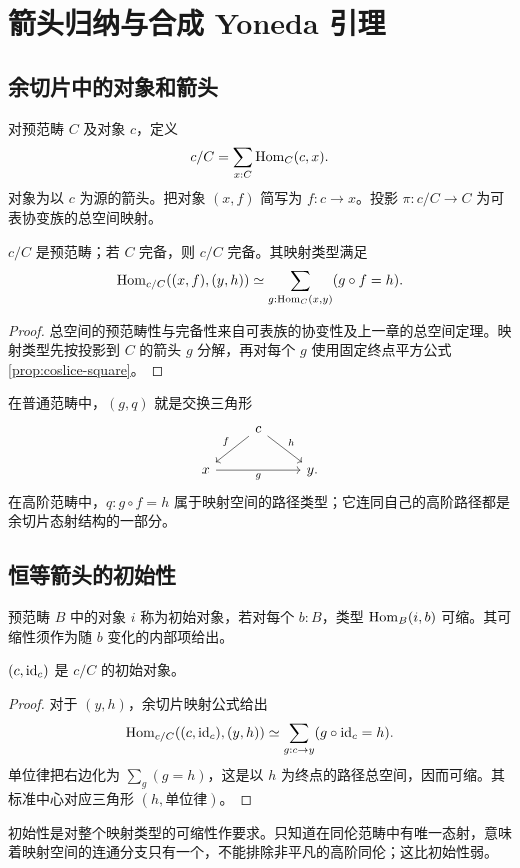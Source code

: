 \chapter{箭头归纳与合成 Yoneda 引理}
\section{余切片中的对象和箭头}
\begin{definition}[余切片]
对预范畴 $C$ 及对象 $c$，定义
\[
c/C=\sum_{x:C}\operatorname{Hom}_C(c,x).
\]
对象为以 $c$ 为源的箭头。把对象 $(x,f)$ 简写为 $f:c\to x$。投影 $\pi:c/C\to C$ 为可表协变族的总空间映射。
\end{definition}
\begin{proposition}
$c/C$ 是预范畴；若 $C$ 完备，则 $c/C$ 完备。其映射类型满足
\[
\operatorname{Hom}_{c/C}((x,f),(y,h))
\simeq\sum_{g:\operatorname{Hom}_C(x,y)}(g\circ f=h).
\]
\end{proposition}
\begin{proof}
总空间的预范畴性与完备性来自可表族的协变性及上一章的总空间定理。映射类型先按投影到 $C$ 的箭头 $g$ 分解，再对每个 $g$ 使用固定终点平方公式\ref{prop:coslice-square}。
\end{proof}
\begin{example}
在普通范畴中，$(g,q)$ 就是交换三角形
\[
\begin{tikzcd}
&c\ar[dl,"f"']\ar[dr,"h"]&\\
x\ar[rr,"g"']&&y.
\end{tikzcd}
\]
在高阶范畴中，$q:g\circ f=h$ 属于映射空间的路径类型；它连同自己的高阶路径都是余切片态射结构的一部分。
\end{example}

\section{恒等箭头的初始性}
\begin{definition}[初始对象]
预范畴 $B$ 中的对象 $i$ 称为初始对象，若对每个 $b:B$，类型 $\operatorname{Hom}_B(i,b)$ 可缩。其可缩性须作为随 $b$ 变化的内部项给出。
\end{definition}
\begin{proposition}[余切片的初始对象]\label{prop:coslice-initial}
$(c,\operatorname{id}_c)$ 是 $c/C$ 的初始对象。
\end{proposition}
\begin{proof}
对于 $(y,h)$，余切片映射公式给出
\[
\operatorname{Hom}_{c/C}((c,\operatorname{id}_c),(y,h))
\simeq\sum_{g:c\to y}(g\circ\operatorname{id}_c=h).
\]
单位律把右边化为 $\sum_g(g=h)$，这是以 $h$ 为终点的路径总空间，因而可缩。其标准中心对应三角形 $(h,\text{单位律})$。
\end{proof}
\begin{remark}
初始性是对整个映射类型的可缩性作要求。只知道在同伦范畴中有唯一态射，意味着映射空间的连通分支只有一个，不能排除非平凡的高阶同伦；这比初始性弱。
\end{remark}


